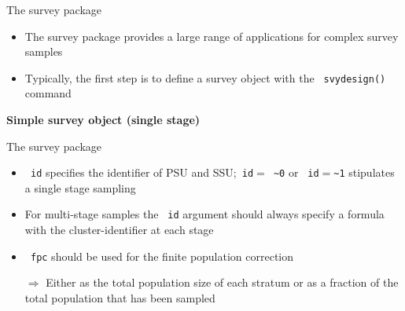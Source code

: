 \documentclass[11pt,german,hideothersubsections]{beamer}
\newcommand{\R}[1]{{\tt \color{blue}  #1}}
\begin{document}
\begin{frame}[fragile]{The survey package}
\footnotesize{
\begin{itemize}
\item The survey package provides a large range of applications for complex survey samples
\item Typically, the first step is to define a survey object with the \R{svydesign()} command
\end{itemize}
\begin{center}
\textbf{Simple survey object (single stage)}
\end{center}
\begin{Schunk}
\end{Schunk}
}
\end{frame}
\begin{frame}[fragile]{The survey package}
\footnotesize{
\begin{Schunk}
\end{Schunk}
}
\begin{itemize}
\item \R{id} specifies the identifier of PSU and SSU;\R{id$=$ \textasciitilde0} or \R{id$=$\textasciitilde1} stipulates a single stage sampling
\item For multi-stage samples the \R{id} argument should always specify a formula with the cluster-identifier at each stage
\item \R{fpc} should be used for the finite population correction
\item[$\Rightarrow$] Either as the total population size of each stratum or as a fraction of the total population that has been sampled 
\end{itemize}
\end{frame}
\end{document}
